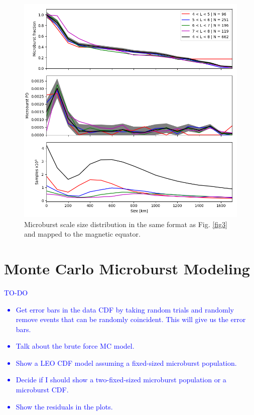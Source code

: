 \documentclass[draft]{agujournal2019}
\begin{document}
\begin{figure}
\includegraphics[width=\textwidth]{fig4.png}
\caption{Microburst scale size distribution in the same format as Fig. \ref{fig3} and mapped to the magnetic equator.} 
\label{fig4}
\end{figure}

\section{Monte Carlo Microburst Modeling}
\textcolor{blue}{
TO-DO
\begin{itemize}
\item Get error bars in the data CDF by taking random trials and randomly remove events that can be randomly coincident. This will give us the error bars.
\item Talk about the brute force MC model.
\item Show a LEO CDF model assuming a fixed-sized microburst population.
\item Decide if I should show a two-fixed-sized microburst population or a microburst CDF.
\item Show the residuals in the plots.
\end{itemize}
}
\end{document}
